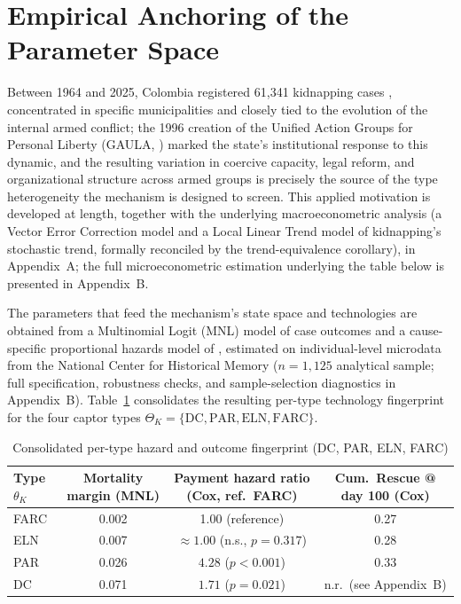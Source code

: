 \documentclass[review,authoryear,12pt]{elsarticle}
\theoremstyle{plain}
\theoremstyle{definition}
\newcommand{\ThetaK}{\Theta_K}
\newcommand{\1}{\mathbf{1}}
\begin{document}
\section{Empirical Anchoring of the Parameter Space}\label{sec:institutional}

Between 1964 and 2025, Colombia registered 61,341 kidnapping cases \citep{cnmh_datos}, concentrated in specific municipalities and closely tied to the evolution of the internal armed conflict; the 1996 creation of the Unified Action Groups for Personal Liberty (GAULA, \citealt{ley282_1996}) marked the state's institutional response to this dynamic, and the resulting variation in coercive capacity, legal reform, and organizational structure across armed groups is precisely the source of the type heterogeneity the mechanism is designed to screen. This applied motivation is developed at length, together with the underlying macroeconometric analysis (a Vector Error Correction model and a Local Linear Trend model of kidnapping's stochastic trend, formally reconciled by the trend-equivalence corollary), in Appendix~A; the full microeconometric estimation underlying the table below is presented in Appendix~B.

The parameters that feed the mechanism's state space and technologies are obtained from a Multinomial Logit (MNL) model of case outcomes and a cause-specific proportional hazards model of \citet{Cox1972}, estimated on individual-level microdata from the National Center for Historical Memory \citep{cnmh_datos} ($n=1{,}125$ analytical sample; full specification, robustness checks, and sample-selection diagnostics in Appendix~B). Table~\ref{tab:hazard-prior-summary} consolidates the resulting per-type technology fingerprint for the four captor types $\ThetaK=\{\text{DC},\text{PAR},\text{ELN},\text{FARC}\}$.

\begin{table}[H]
\centering
\caption{Consolidated per-type hazard and outcome fingerprint (DC, PAR, ELN, FARC)}
\label{tab:hazard-prior-summary}
\begin{tabular}{lccc}
\toprule
Type $\theta_K$ & Mortality margin (MNL) & Payment hazard ratio (Cox, ref.\ FARC) & Cum.\ Rescue @ day 100 (Cox) \\
\midrule
FARC & 0.002 & 1.00 (reference) & 0.27 \\
ELN  & 0.007 & $\approx 1.00$ (n.s., $p=0.317$) & 0.28 \\
PAR  & 0.026 & $4.28$ ($p<0.001$) & 0.33 \\
DC   & 0.071 & $1.71$ ($p=0.021$) & n.r.\ (see Appendix~B) \\
\bottomrule
\end{tabular}
\end{table}
\end{document}
